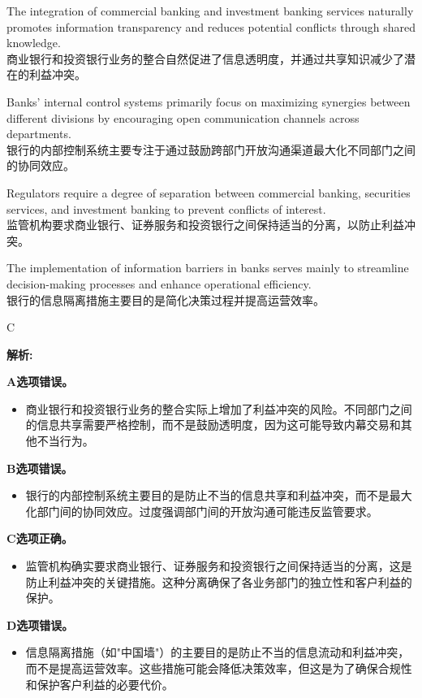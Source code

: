 \documentclass{article}
\newenvironment{explanation}
{\textbf{解析:}\par}
{\par}
\begin{document}
\begin{choices}
    \item The integration of commercial banking and investment banking services naturally promotes information transparency and reduces potential conflicts through shared knowledge.\\商业银行和投资银行业务的整合自然促进了信息透明度，并通过共享知识减少了潜在的利益冲突。
    \item Banks' internal control systems primarily focus on maximizing synergies between different divisions by encouraging open communication channels across departments.\\银行的内部控制系统主要专注于通过鼓励跨部门开放沟通渠道最大化不同部门之间的协同效应。
    \item Regulators require a degree of separation between commercial banking, securities services, and investment banking to prevent conflicts of interest.\\监管机构要求商业银行、证券服务和投资银行之间保持适当的分离，以防止利益冲突。
    \item The implementation of information barriers in banks serves mainly to streamline decision-making processes and enhance operational efficiency.\\银行的信息隔离措施主要目的是简化决策过程并提高运营效率。
\end{choices}

\begin{correctanswer}
    C
\end{correctanswer}

\begin{explanation}
    \textbf{A选项错误。}
    \begin{itemize}
        \item 商业银行和投资银行业务的整合实际上增加了利益冲突的风险。不同部门之间的信息共享需要严格控制，而不是鼓励透明度，因为这可能导致内幕交易和其他不当行为。
    \end{itemize}
    
    \textbf{B选项错误。}
    \begin{itemize}
        \item 银行的内部控制系统主要目的是防止不当的信息共享和利益冲突，而不是最大化部门间的协同效应。过度强调部门间的开放沟通可能违反监管要求。
    \end{itemize}
    
    \textbf{C选项正确。}
    \begin{itemize}
        \item 监管机构确实要求商业银行、证券服务和投资银行之间保持适当的分离，这是防止利益冲突的关键措施。这种分离确保了各业务部门的独立性和客户利益的保护。
    \end{itemize}

    \textbf{D选项错误。}
    \begin{itemize}
        \item 信息隔离措施（如"中国墙"）的主要目的是防止不当的信息流动和利益冲突，而不是提高运营效率。这些措施可能会降低决策效率，但这是为了确保合规性和保护客户利益的必要代价。
    \end{itemize}
\end{explanation}
\end{document}
